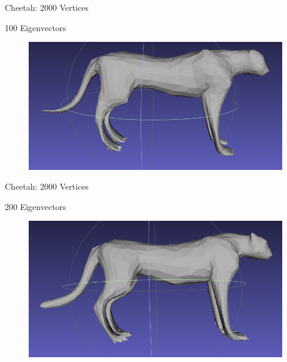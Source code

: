 \documentclass{beamer}
\begin{document}
\begin{frame}{Cheetah: 2000 Vertices}

100 Eigenvectors
\begin{figure}[t]
    \includegraphics[width=\textwidth]{Harmonics/CheetahProjections/CheetahProj100.png}
\end{figure}

\end{frame}


\begin{frame}{Cheetah: 2000 Vertices}

200 Eigenvectors
\begin{figure}[t]
    \includegraphics[width=\textwidth]{Harmonics/CheetahProjections/CheetahProj200.png}
\end{figure}

\end{frame}
\end{document}
